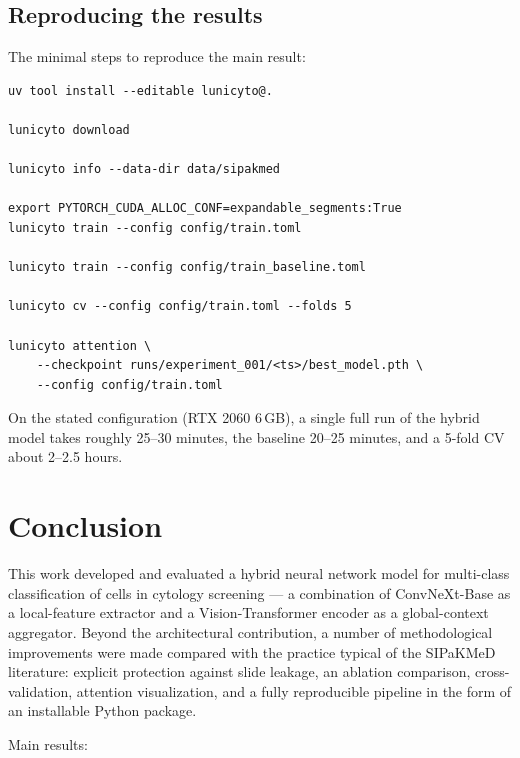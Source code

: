 \documentclass[14pt,a4paper]{extreport}
\begin{document}
\section{Reproducing the results}

The minimal steps to reproduce the main result:

\begin{lstlisting}[basicstyle=\ttfamily\footnotesize]
uv tool install --editable lunicyto@.

lunicyto download

lunicyto info --data-dir data/sipakmed

export PYTORCH_CUDA_ALLOC_CONF=expandable_segments:True
lunicyto train --config config/train.toml

lunicyto train --config config/train_baseline.toml

lunicyto cv --config config/train.toml --folds 5

lunicyto attention \
    --checkpoint runs/experiment_001/<ts>/best_model.pth \
    --config config/train.toml
\end{lstlisting}

On the stated configuration (RTX 2060 6\,GB), a single full run of the
hybrid model takes roughly 25--30 minutes, the baseline 20--25 minutes,
and a 5-fold CV about 2--2.5 hours.

\chapter*{Conclusion}
\label{ch:conclusion}

This work developed and evaluated a hybrid neural network model for
multi-class classification of cells in cytology screening --- a
combination of ConvNeXt-Base as a local-feature extractor and a
Vision-Transformer encoder as a global-context aggregator. Beyond the
architectural contribution, a number of methodological improvements were
made compared with the practice typical of the SIPaKMeD literature:
explicit protection against slide leakage, an ablation comparison,
cross-validation, attention visualization, and a fully reproducible
pipeline in the form of an installable Python package.

Main results:
\end{document}
